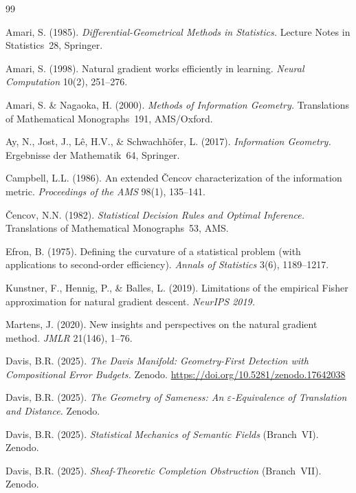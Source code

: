\documentclass[11pt]{article}
\theoremstyle{remark}
\begin{document}
\begin{thebibliography}{99}

Amari, S. (1985).
\emph{Differential-Geometrical Methods in Statistics.}
Lecture Notes in Statistics~28, Springer.

Amari, S. (1998).
Natural gradient works efficiently in learning.
\emph{Neural Computation} 10(2), 251--276.

Amari, S. \& Nagaoka, H. (2000).
\emph{Methods of Information Geometry.}
Translations of Mathematical Monographs~191, AMS/Oxford.

Ay, N., Jost, J., L\^e, H.V., \& Schwachh\"ofer, L. (2017).
\emph{Information Geometry.}
Ergebnisse der Mathematik~64, Springer.

Campbell, L.L. (1986).
An extended \v{C}encov characterization of the information metric.
\emph{Proceedings of the AMS} 98(1), 135--141.

\v{C}encov, N.N. (1982).
\emph{Statistical Decision Rules and Optimal Inference.}
Translations of Mathematical Monographs~53, AMS.

Efron, B. (1975).
Defining the curvature of a statistical problem (with applications to
second-order efficiency).
\emph{Annals of Statistics} 3(6), 1189--1217.

Kunstner, F., Hennig, P., \& Balles, L. (2019).
Limitations of the empirical Fisher approximation for natural gradient
descent.
\emph{NeurIPS 2019.}

Martens, J. (2020).
New insights and perspectives on the natural gradient method.
\emph{JMLR} 21(146), 1--76.

Davis, B.R. (2025).
\emph{The Davis Manifold: Geometry-First Detection with Compositional
Error Budgets.}
Zenodo.
\url{https://doi.org/10.5281/zenodo.17642038}

Davis, B.R. (2025).
\emph{The Geometry of Sameness: An $\varepsilon$-Equivalence of Translation
and Distance.}
Zenodo.

Davis, B.R. (2025).
\emph{Statistical Mechanics of Semantic Fields} (Branch~VI).
Zenodo.

Davis, B.R. (2025).
\emph{Sheaf-Theoretic Completion Obstruction} (Branch~VII).
Zenodo.


\end{thebibliography}
\end{document}

